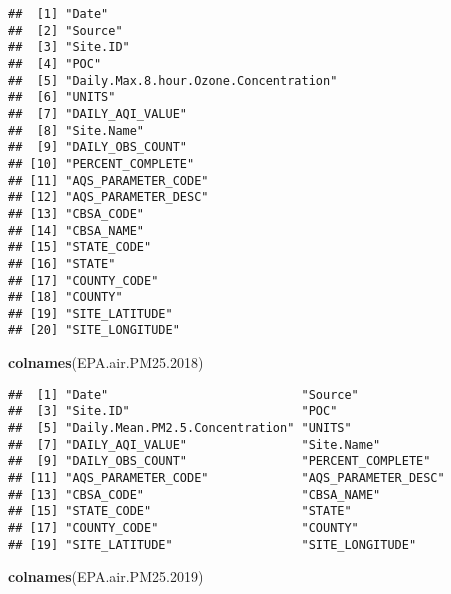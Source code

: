 \documentclass[]{article}
\newenvironment{Shaded}{\begin{snugshade}}{\end{snugshade}}
\newcommand{\FloatTok}[1]{\textcolor[rgb]{0.00,0.00,0.81}{#1}}
\newcommand{\KeywordTok}[1]{\textcolor[rgb]{0.13,0.29,0.53}{\textbf{#1}}}
\newcommand{\NormalTok}[1]{#1}
\begin{document}
\begin{verbatim}
##  [1] "Date"                                
##  [2] "Source"                              
##  [3] "Site.ID"                             
##  [4] "POC"                                 
##  [5] "Daily.Max.8.hour.Ozone.Concentration"
##  [6] "UNITS"                               
##  [7] "DAILY_AQI_VALUE"                     
##  [8] "Site.Name"                           
##  [9] "DAILY_OBS_COUNT"                     
## [10] "PERCENT_COMPLETE"                    
## [11] "AQS_PARAMETER_CODE"                  
## [12] "AQS_PARAMETER_DESC"                  
## [13] "CBSA_CODE"                           
## [14] "CBSA_NAME"                           
## [15] "STATE_CODE"                          
## [16] "STATE"                               
## [17] "COUNTY_CODE"                         
## [18] "COUNTY"                              
## [19] "SITE_LATITUDE"                       
## [20] "SITE_LONGITUDE"
\end{verbatim}

\begin{Shaded}
\begin{Highlighting}[]
\KeywordTok{colnames}\NormalTok{(EPA.air.PM25}\FloatTok{.2018}\NormalTok{)}
\end{Highlighting}
\end{Shaded}

\begin{verbatim}
##  [1] "Date"                           "Source"                        
##  [3] "Site.ID"                        "POC"                           
##  [5] "Daily.Mean.PM2.5.Concentration" "UNITS"                         
##  [7] "DAILY_AQI_VALUE"                "Site.Name"                     
##  [9] "DAILY_OBS_COUNT"                "PERCENT_COMPLETE"              
## [11] "AQS_PARAMETER_CODE"             "AQS_PARAMETER_DESC"            
## [13] "CBSA_CODE"                      "CBSA_NAME"                     
## [15] "STATE_CODE"                     "STATE"                         
## [17] "COUNTY_CODE"                    "COUNTY"                        
## [19] "SITE_LATITUDE"                  "SITE_LONGITUDE"
\end{verbatim}

\begin{Shaded}
\begin{Highlighting}[]
\KeywordTok{colnames}\NormalTok{(EPA.air.PM25}\FloatTok{.2019}\NormalTok{)}
\end{Highlighting}
\end{Shaded}
\end{document}

